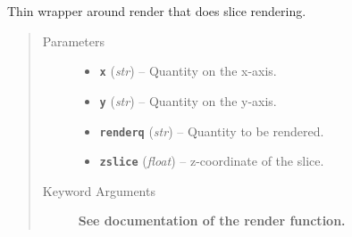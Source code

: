 \documentclass[letterpaper,10pt,english]{sphinxmanual}
\begin{document}
\begin{fulllineitems}
\label{index:facade.renderslice}
Thin wrapper around render that does slice rendering.
\begin{quote}\begin{description}
\item[{Parameters}] \leavevmode\begin{itemize}
\item {} 
\textbf{\texttt{x}} (\emph{str}) -- Quantity on the x-axis.

\item {} 
\textbf{\texttt{y}} (\emph{str}) -- Quantity on the y-axis.

\item {} 
\textbf{\texttt{renderq}} (\emph{str}) -- Quantity to be rendered.

\item {} 
\textbf{\texttt{zslice}} (\emph{float}) -- z-coordinate of the slice.

\end{itemize}

\item[{Keyword Arguments}] \leavevmode
\textbf{See documentation of the render function.}

\end{description}\end{quote}

\end{fulllineitems}

\end{document}

